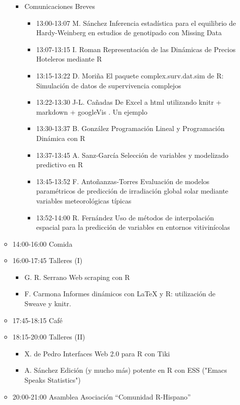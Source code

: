 \begin{itemize}
\begin{itemize}
\begin{itemize}
    \item Comunicaciones Breves
      \begin{itemize}
      \item 13:00-13:07 M. Sánchez Inferencia estadística para el
        equilibrio de Hardy-Weinberg en estudios de genotipado con
        Missing Data
      \item 13:07-13:15 I. Roman Representación de las Dinámicas
        de Precios Hoteleros mediante R
      \item 13:15-13:22 D. Moriña El paquete complex.surv.dat.sim
        de R: Simulación de datos de supervivencia complejos
      \item 13:22-13:30 J-L. Cañadas De Excel a html utilizando
        knitr + markdown + googleVis . Un ejemplo
      \item 13:30-13:37 B. González Programación Lineal y
        Programación Dinámica con R
      \item 13:37-13:45 A. Sanz-García Selección de variables y
        modelizado predictivo en R
      \item 13:45-13:52 F. Antoñanzas-Torres Evaluación de modelos
        paramétricos de predicción de irradiación global solar
        mediante variables meteorológicas típicas
      \item 13:52-14:00 R. Fernández Uso de métodos de
        interpolación espacial para la predicción de variables en
        entornos vitivinícolas
      \end{itemize}
    \end{itemize}

  \item 14:00-16:00 Comida
  \item 16:00-17:45 Talleres (I)
    \begin{itemize}
    \item G. R. Serrano Web scraping con R
    \item F. Carmona Informes dinámicos con LaTeX y R: utilización
      de Sweave y knitr.
    \end{itemize}

  \item 17:45-18:15 Café
  \item 18:15-20:00 Talleres (II)
    \begin{itemize}
    \item X. de Pedro Interfaces Web 2.0 para R con Tiki
    \item A. Sánchez Edición (y mucho más) potente en R con ESS
      ("Emacs Speaks Statistics")
    \end{itemize}
  \item 20:00-21:00 Asamblea Asociación “Comunidad R-Hispano”


\end{itemize}
\end{itemize}
